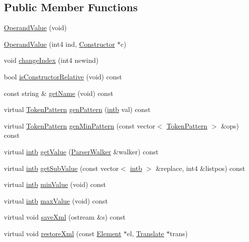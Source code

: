\subsection*{Public Member Functions}
\begin{DoxyCompactItemize}
\item 
\mbox{\hyperlink{class_operand_value_a962f023ae983e21b6e9363ccd890d700}{Operand\+Value}} (void)
\item 
\mbox{\hyperlink{class_operand_value_ae835ffc9c50d120bd13dbc4b098f5eaa}{Operand\+Value}} (int4 ind, \mbox{\hyperlink{class_constructor}{Constructor}} $\ast$c)
\item 
void \mbox{\hyperlink{class_operand_value_aeaca8cd698f9e9d722c0d4bbb6e53953}{change\+Index}} (int4 newind)
\item 
bool \mbox{\hyperlink{class_operand_value_ac5edba5396509e93a2c4b9940189f8e2}{is\+Constructor\+Relative}} (void) const
\item 
const string \& \mbox{\hyperlink{class_operand_value_ade99629239e3381551cf0872c6ed31e4}{get\+Name}} (void) const
\item 
virtual \mbox{\hyperlink{class_token_pattern}{Token\+Pattern}} \mbox{\hyperlink{class_operand_value_ab0c4823f1e2e5f9a26a403dce82f4310}{gen\+Pattern}} (\mbox{\hyperlink{types_8h_aa925ba3e627c2df89d5b1cfe84fb8572}{intb}} val) const
\item 
virtual \mbox{\hyperlink{class_token_pattern}{Token\+Pattern}} \mbox{\hyperlink{class_operand_value_ad483d53c77f85d1042bbb05749c07a20}{gen\+Min\+Pattern}} (const vector$<$ \mbox{\hyperlink{class_token_pattern}{Token\+Pattern}} $>$ \&ops) const
\item 
virtual \mbox{\hyperlink{types_8h_aa925ba3e627c2df89d5b1cfe84fb8572}{intb}} \mbox{\hyperlink{class_operand_value_a5e43ba8332983fb0268dac1ce7903f19}{get\+Value}} (\mbox{\hyperlink{class_parser_walker}{Parser\+Walker}} \&walker) const
\item 
virtual \mbox{\hyperlink{types_8h_aa925ba3e627c2df89d5b1cfe84fb8572}{intb}} \mbox{\hyperlink{class_operand_value_a76d6f76e74edfb71ce1cd126c44a3788}{get\+Sub\+Value}} (const vector$<$ \mbox{\hyperlink{types_8h_aa925ba3e627c2df89d5b1cfe84fb8572}{intb}} $>$ \&replace, int4 \&listpos) const
\item 
virtual \mbox{\hyperlink{types_8h_aa925ba3e627c2df89d5b1cfe84fb8572}{intb}} \mbox{\hyperlink{class_operand_value_a5be26ae272c87ca0e0bbbc52c627c62a}{min\+Value}} (void) const
\item 
virtual \mbox{\hyperlink{types_8h_aa925ba3e627c2df89d5b1cfe84fb8572}{intb}} \mbox{\hyperlink{class_operand_value_af085d3749d762be4f5e30339c063a009}{max\+Value}} (void) const
\item 
virtual void \mbox{\hyperlink{class_operand_value_a106fcb5ccb3fd95a0d97efffd622bc5d}{save\+Xml}} (ostream \&s) const
\item 
virtual void \mbox{\hyperlink{class_operand_value_a65387cdd12b8e6135bd9899c76dd2f39}{restore\+Xml}} (const \mbox{\hyperlink{class_element}{Element}} $\ast$el, \mbox{\hyperlink{class_translate}{Translate}} $\ast$trans)
\end{DoxyCompactItemize}
